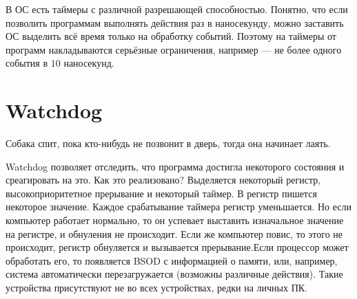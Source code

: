 \documentclass[main]{subfiles}
\begin{document}
В ОС есть таймеры с различной разрешающей способностью. Понятно, что если
позволить программам выполнять действия раз в наносекунду, можно заставить
ОС выделить всё время только на обработку событий. Поэтому на таймеры от
программ накладываются серьёзные ограничения, например --- не более одного
события в $10$ наносекунд.

\section{Watchdog}
Собака спит, пока кто-нибудь не позвонит в дверь, тогда она начинает лаять.

Watchdog позволяет отследить, что программа достигла некоторого состояния и
среагировать на это. Как это реализовано? Выделяется некоторый регистр,
высокоприоритетное прерывание и некоторый таймер. В регистр пишется
некоторое значение. Каждое срабатывание таймера регистр уменьшается. Но если компьютер 
работает нормально, то он успевает выставить изначальное значение на регистре,
и обнуления не происходит. Если же компьютер повис, то этого не происходит, 
регистр обнуляется и вызывается прерывание.Если процессор
может обработать его, то появляется BSOD с информацией о памяти, или, например,
система автоматически перезагружается (возможны различные действия).
Такие устройства присутствуют не во всех устройствах, редки на личных ПК.
\end{document}
